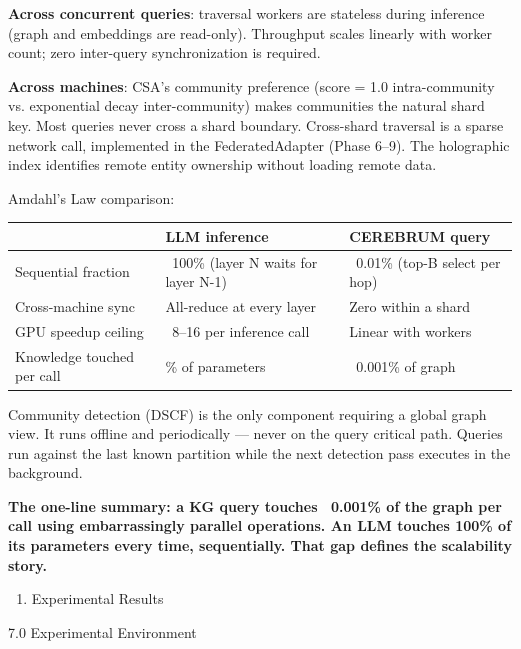 \documentclass[10pt,journal,compsoc]{IEEEtran}
\begin{document}
\textbf{Across concurrent queries}: traversal workers are stateless during inference (graph and embeddings are read-only). Throughput scales linearly with worker count; zero inter-query synch\-ronization is required.

\textbf{Across machines}: CSA's community preference (score = 1.0 intra-community vs. exponential decay inter-community) makes communities the natural shard key. Most queries never cross a shard boundary. Cross-shard traversal is a sparse network call, implemented in the FederatedAdapter (Phase 6–9). The holographic index identifies remote entity ownership without loading remote data.

Amdahl's Law comparison:

\begin{center}
{\footnotesize
\begin{tabularx}{\columnwidth}{|>{\raggedright\arraybackslash}X|>{\raggedright\arraybackslash}X|>{\raggedright\arraybackslash}X|}
\hline
 & LLM inference & CEREBRUM query \\ \hline
Sequential fraction & ~100\% (layer N waits for layer N-1) & ~0.01\% (top-B select per hop) \\ \hline
Cross-machine sync & All-reduce at every layer & Zero within a shard \\ \hline
GPU speedup ceiling & ~8–16 per inference call & Linear with workers \\ \hline
Knowledge touched per call & 100\% of parameters & ~0.001\% of graph \\ \hline
\end{tabularx}
}
\end{center}

Community detection (DSCF) is the only component requiring a global graph view. It runs offline and perio\-dically — never on the query critical path. Queries run against the last known partition while the next detection pass executes in the background.

\textbf{The one-line summary: a KG query touches ~0.001\% of the graph per call using embar\-rassingly parallel operations. An LLM touches 100\% of its parameters every time, seque\-ntially. That gap defines the scalability story.}

\begin{enumerate}
\item Experi\-mental Results

\end{enumerate}
7.0 Experi\-mental Environment
\end{document}
